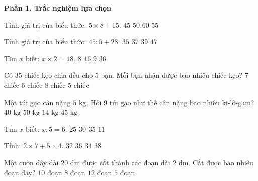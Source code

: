 \textbf{Phần 1. Trắc nghiệm lựa chọn}

\begin{ex} %
Tính giá trị của biểu thức: $5 \times 8 + 15$.
\choice
{$45$}
{$50$}
{$60$}
{\True $55$}
\end{ex}

\begin{ex} %
Tính giá trị của biểu thức: $45 : 5 + 28$.
\choice
{$35$}
{\True $37$}
{$39$}
{$47$}
\end{ex}

\begin{ex} %
Tìm $x$ biết: $x \times 2 = 18$.
\choice
{$8$}
{$16$}
{\True $9$}
{$36$}
\end{ex}

\begin{ex} %
Có $35$ chiếc kẹo chia đều cho $5$ bạn. Mỗi bạn nhận được bao nhiêu chiếc kẹo?
\choice
{\True $7$ chiếc}
{$6$ chiếc}
{$8$ chiếc}
{$5$ chiếc}
\end{ex}

\begin{ex} %
Một túi gạo cân nặng $5\text{ kg}$. Hỏi $9$ túi gạo như thế cân nặng bao nhiêu ki-lô-gam?
\choice
{$40\text{ kg}$}
{$50\text{ kg}$}
{$14\text{ kg}$}
{\True $45\text{ kg}$}
\end{ex}

\begin{ex} %
Tìm $x$ biết: $x : 5 = 6$.
\choice
{$25$}
{\True $30$}
{$35$}
{$11$}
\end{ex}

\begin{ex} %
Tính: $2 \times 7 + 5 \times 4$.
\choice
{$32$}
{$36$}
{\True $34$}
{$38$}
\end{ex}

\begin{ex} %
Một cuộn dây dài $20\text{ dm}$ được cắt thành các đoạn dài $2\text{ dm}$. Cắt được bao nhiêu đoạn dây?
\choice
{\True $10$ đoạn}
{$8$ đoạn}
{$12$ đoạn}
{$5$ đoạn}
\end{ex}

